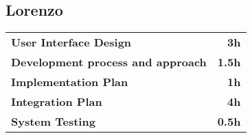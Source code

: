 \subsection*{Lorenzo}
\begin{table}[H]
    \begin{tabular}{lr}
        \toprule
        \textbf{User Interface Design} & \textbf{3h} \\
        \textbf{Development process and approach} & \textbf{1.5h} \\
        \textbf{Implementation Plan} & \textbf{1h} \\
        \textbf{Integration Plan} & \textbf{4h} \\
        \textbf{System Testing} & \textbf{0.5h} \\
        \bottomrule
    \end{tabular}
\end{table}
